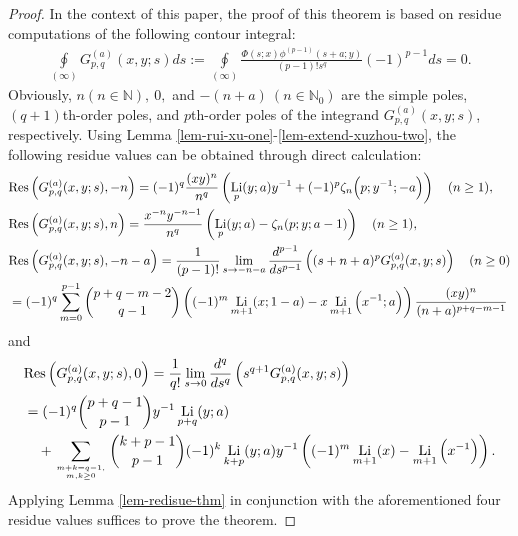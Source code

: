 \documentclass[11pt]{article}
\newcommand\Res{{\rm Res}}
\DeclareMathOperator{\Li}{Li}
\def\N{\mathbb{N}}
\theoremstyle{plain}
\theoremstyle{definition}
\begin{document}
\begin{proof}
In the context of this paper, the proof of this theorem is based on residue computations of the following contour integral:
\begin{align*}
\oint\limits_{\left( \infty  \right)} G^{(a)}_{p,q}(x,y;s)ds:= \oint\limits_{\left( \infty  \right)} \frac{\Phi(s;x)\phi^{(p-1)}(s+a;y)}{(p-1)!s^q} (-1)^{p-1}ds=0.
\end{align*}
Obviously, $n (n\in\N),\ 0,$ and $-(n + a)\ (n\in \N_0)$ are the simple poles, $(q+1)$th-order poles, and $p$th-order poles of the integrand $G^{(a)}_{p,q}(x,y;s)$, respectively. Using Lemma \ref{lem-rui-xu-one}-\ref{lem-extend-xuzhou-two}, the following residue values can be obtained through direct calculation:
\begin{align*}
&\Res\left(G^{(a)}_{p,q}(x,y;s),-n\right)=(-1)^q\frac{(xy)^n}{n^q}\left(\Li_p(y;a)y^{-1}+(-1)^p\zeta_n\Big(p;y^{-1};-a\Big) \right) \quad (n\geq 1),\\
&\Res\left(G^{(a)}_{p,q}(x,y;s),n\right)=\frac{x^{-n}y^{-n-1}}{n^q}\left(\Li_p(y;a)-\zeta_n(p;y;a-1)\right)\quad (n\geq 1),\\
&\Res\left(G^{(a)}_{p,q}(x,y;s),-n-a\right)=\frac1{(p-1)!} \lim_{s\rightarrow -n-a} \frac{d^{p-1}}{ds^{p-1}}\left((s+n+a)^pG^{(a)}_{p,q}(x,y;s)\right)\quad (n\geq 0)\\
&=(-1)^q\sum_{m=0}^{p-1} \binom{p+q-m-2}{q-1} \left((-1)^m \Li_{m+1}(x;1-a)-x \Li_{m+1}\Big(x^{-1};a\Big) \right) \frac{(xy)^n}{(n+a)^{p+q-m-1}}
\end{align*}
and
\begin{align*}
&\Res\left(G^{(a)}_{p,q}(x,y;s),0\right)=\frac1{q!} \lim_{s\rightarrow 0} \frac{d^{q}}{ds^{q}}\left(s^{q+1}G^{(a)}_{p,q}(x,y;s)\right)\\
&=(-1)^q\binom{p+q-1}{p-1}y^{-1}\Li_{p+q}(y;a)\\&\quad+\sum_{m+k=q-1,\atop m,k\geq 0} \binom{k+p-1}{p-1}(-1)^k \Li_{k+p}(y;a)y^{-1}\left((-1)^m\Li_{m+1}(x)-\Li_{m+1}\Big(x^{-1}\Big)\right).
\end{align*}
Applying Lemma \ref{lem-redisue-thm} in conjunction with the aforementioned four residue values suffices to prove the theorem.
\end{proof}
\end{document}
